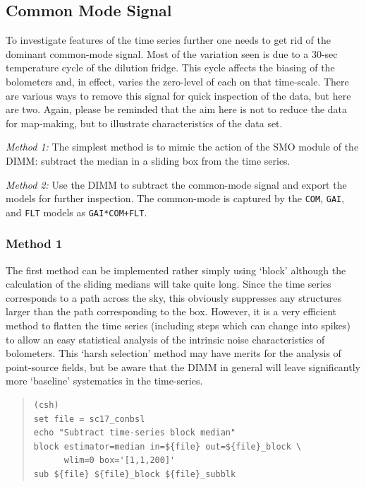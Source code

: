 \documentclass[twoside,11pt]{article}
\newcommand{\xlabel}[1]{}
\renewcommand{\_}{\texttt{\symbol{95}}}
\newenvironment{myquote}{\begin{quote}\begin{small}}{\end{small}\end{quote}}
\begin{document}
\subsection{\xlabel{commonmode}Common Mode Signal}
\label{sec:commonmode}

To investigate features of the time series further one needs to get
rid of the dominant common-mode signal. Most of the variation seen is
due to a 30-sec temperature cycle of the dilution fridge. This cycle
affects the biasing of the bolometers and, in effect, varies the
zero-level of each on that time-scale. There are various ways to
remove this signal for quick inspection of the data, but here are two.
Again, please be reminded that the aim here is not to reduce the data
for map-making, but to illustrate characteristics of the data set.

\textsl{Method 1:} The simplest method is to mimic the action of the SMO module
of the DIMM: subtract the median in a sliding box from the time
series.

\textsl{Method 2:} Use the DIMM to subtract the common-mode signal and
export the models for further inspection. The common-mode is captured
by the \texttt{COM}, \texttt{GAI}, and \texttt{FLT} models as
\texttt{GAI*COM+FLT}.

\subsubsection{\xlabel{method1}Method 1}
\label{sec:method1}

The first method can be implemented rather simply using `block'
although the calculation of the sliding medians will take quite
long. Since the time series corresponds to a path across the sky, this
obviously suppresses any structures larger than the path corresponding
to the box. However, it is a very efficient method to flatten the time
series (including steps which can change into spikes) to allow an easy
statistical analysis of the intrinsic noise characteristics of
bolometers.  This `harsh selection' method may have merits for the
analysis of point-source fields, but be aware that the DIMM
in general will leave significantly more `baseline' systematics in the
time-series.

\begin{myquote}
\begin{verbatim}
(csh)
set file = sc17_conbsl
echo "Subtract time-series block median"
block estimator=median in=${file} out=${file}_block \
      wlim=0 box='[1,1,200]'
sub ${file} ${file}_block ${file}_subblk
\end{verbatim}
\end{myquote}
\end{document}
